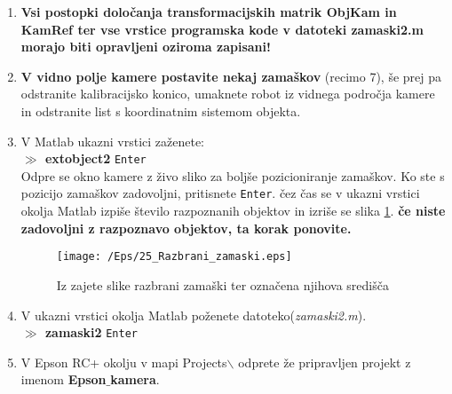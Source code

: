 \begin{enumerate}


\item[1)] \textbf{Vsi postopki določanja
transformacijskih matrik ObjKam in KamRef ter vse vrstice programska
kode v datoteki zamaski2.m morajo biti opravljeni oziroma zapisani!} \\%

\item[2)] \textbf{V vidno polje kamere postavite nekaj zamaškov}
(recimo 7), še prej pa odstranite kalibracijsko konico, umaknete
robot iz vidnega področja kamere in odstranite list s
koordinatnim sistemom objekta. \\ %

\item[3)] V Matlab ukazni vrstici zaženete: \\ %
\textbf{$\gg$ extobject2} \verb"Enter" \\ %


Odpre se okno kamere z živo sliko za boljše pozicioniranje zamaškov.
Ko ste s pozicijo zamaškov zadovoljni, pritisnete \verb"Enter". čez čas se%
v ukazni vrstici okolja Matlab izpiše število razpoznanih objektov
in izriše se slika \ref{fRazbraniZamaski}. \textbf{če niste
zadovoljni z razpoznavo objektov, ta korak ponovite.} %

\begin{figure}[!h]
    \center
    \texttt{[image: /Eps/25\_Razbrani\_zamaski.eps]}
    \vspace{-0.3cm}
    \caption{Iz zajete slike razbrani zamaški ter označena njihova središča}
    \label{fRazbraniZamaski}
\end{figure}

\item[4)] V ukazni vrstici okolja Matlab poženete datoteko(\emph{zamaski2.m}).  \\ %

\textbf{$\gg$ zamaski2} \verb"Enter" \\ %
\vspace{-0.1cm} %

\item[5)] V Epson RC+ okolju v mapi Projects$\backslash$ odprete že pripravljen projekt z imenom \textbf{Epson$\_$kamera}. \\ %


\end{enumerate}
